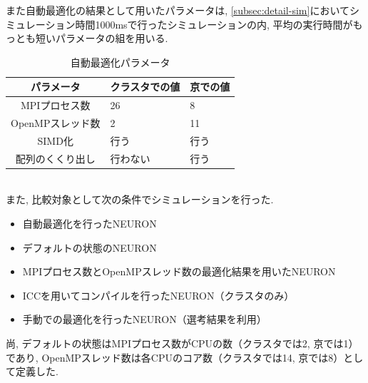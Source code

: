 また自動最適化の結果として用いたパラメータは,
\ref{subsec:detail-sim}においてシミュレーション時間1000msで行ったシミュレーションの内,
平均の実行時間がもっとも短いパラメータの組を用いる.\\
\begin{table}[htb]
  \caption {自動最適化パラメータ}
  \begin{center}
    \begin{tabular}{|c|l|l|}
      \hline
      パラメータ & クラスタでの値 & 京での値\\ \hline
      MPIプロセス数 & 26 & 8\\ \hline
      OpenMPスレッド数 & 2 & 11\\ \hline
      SIMD化 & 行う & 行う\\ \hline
      配列のくくり出し & 行わない & 行う \\ \hline
    \end{tabular}
    \label{table:auto-tuned-param}
  \end{center}
\end{table}
\\
また, 比較対象として次の条件でシミュレーションを行った.\\
\begin{itemize}
\item 自動最適化を行ったNEURON
\item デフォルトの状態のNEURON
\item MPIプロセス数とOpenMPスレッド数の最適化結果を用いたNEURON
\item ICCを用いてコンパイルを行ったNEURON（クラスタのみ）
\item 手動での最適化を行ったNEURON（選考結果\cite{miyamoto-master}を利用）
\end{itemize}
尚, デフォルトの状態はMPIプロセス数がCPUの数（クラスタでは2, 京では1）であり,
OpenMPスレッド数は各CPUのコア数（クラスタでは14, 京では8）として定義した.\\
